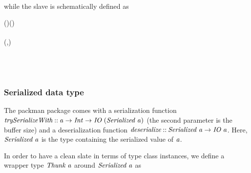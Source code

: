 \documentclass[paper=A4,twoside=true,openright,parskip=full,chapterprefix=true,headings=normal,bibliography=totoc,listof=totoc,titlepage=on,captions=tableabove,draft=false,british]{scrreprt}%
\begin{document}
while the slave is schematically defined as


\begin{hscode}\SaveRestoreHook
{}%
%
%
\>[B]{}\mathbin{::}\;(\;)\to {}\;\to {}\;(){}\<[E]%
\\
\>[B]{}\;\;\mathrel{=}\<[E]%
\\
\>[B]{}\<[5]%
\>[5]{}(,)\leftarrow {}\<[E]%
\\[\blanklineskip]%
\>[B]{}\<[5]%
\>[5]{}\;\;\<[E]%
\\[\blanklineskip]%
\>[B]{}\<[5]%
\>[5]{}\leftarrow {}\;\<[E]%
\\[\blanklineskip]%
\>[B]{}\<[5]%
\>[5]{}\;\mathrel{=}\;\<[E]%
\\[\blanklineskip]%
\>[B]{}\<[5]%
\>[5]{}\;\;\<[E]%
\ColumnHook
\end{hscode}\resethooks
\vspace{-2\baselineskip}

\hypertarget{serialized-data-type}{%
\subsubsection{Serialized data type}\label{serialized-data-type}}

The packman package comes with a serialization function
\ensuremath{\Varid{trySerializeWith}\mathbin{::}\Varid{a}\to \Conid{Int}\to \Conid{IO}\;(\Conid{Serialized}\;\Varid{a})} (the second
parameter is the buffer size) and a deserialization function
\ensuremath{\Varid{deserialize}\mathbin{::}\Conid{Serialized}\;\Varid{a}\to \Conid{IO}\;\Varid{a}}. Here, \ensuremath{\Conid{Serialized}\;\Varid{a}} is the type
containing the serialized value of \ensuremath{\Varid{a}}.

In order to have a clean slate in terms of type class instances, we
define a wrapper type \ensuremath{\Conid{Thunk}\;\Varid{a}} around \ensuremath{\Conid{Serialized}\;\Varid{a}} as
\end{document}
